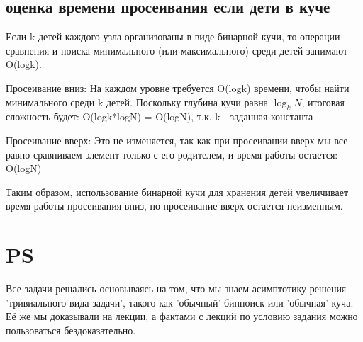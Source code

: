\documentclass[a4paper,14pt]{article}
\begin{document}
\subsection{оценка времени просеивания если дети в куче}
Если k детей каждого узла организованы в виде бинарной кучи, то операции сравнения и поиска минимального (или максимального) среди детей занимают O(logk).

Просеивание вниз:
На каждом уровне требуется O(logk) времени, чтобы найти минимального среди k детей. Поскольку глубина кучи равна $\log_k{N}$, итоговая сложность будет: O(logk*logN) = O(logN), т.к. k - заданная константа

Просеивание вверх:
Это не изменяется, так как при просеивании вверх мы все равно сравниваем элемент только с его родителем, и время работы остается: O(logN)

Таким образом, использование бинарной кучи для хранения детей увеличивает время работы просеивания вниз, но просеивание вверх остается неизменным.

\section{PS}
Все задачи решались основываясь на том, что мы знаем асимптотику решения 'тривиального вида задачи', такого как 'обычный' бинпоиск или 'обычная' куча. Её же мы доказывали на лекции, а фактами с лекций по условию задания можно пользоваться бездоказательно. 
\end{document}
